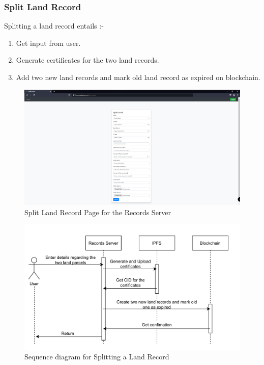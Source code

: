 \documentclass{article}
\begin{document}
        \subsubsection{Split Land Record}
            Splitting a land record entails :-
            \begin{enumerate}
                \item Get input from user.
                \item Generate certificates for the two land records.
                \item Add two new land records and mark old land record as expired on blockchain.
            \end{enumerate}
            
            \begin{figure}[htbp]
                \includegraphics[scale=0.25]{records_split}
                \centering
                \caption{Split Land Record Page for the Records Server}
            \end{figure}

            \begin{figure}[htbp]
                \includegraphics[scale=0.25]{records_seq_split_land}
                \centering
                \caption{Sequence diagram for Splitting a Land Record}
            \end{figure}
            
\end{document}
